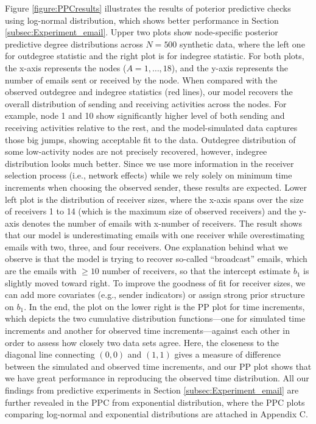 \documentclass[ba]{imsart}
\numberwithin{equation}{section}
\theoremstyle{plain}
\begin{document}
	Figure \ref{figure:PPCresults} illustrates the results of poterior predictive checks using log-normal distribution, which shows better performance in Section \ref{subsec:Experiment_email}. Upper two plots show node-specific posterior predictive degree distributions across $N=500$ synthetic data, where the left one for outdegree statistic and the right plot is for indegree statistic. For both plots, the x-axis represents the nodes ($A=1,\ldots,18$), and the y-axis represents the number of emails sent or received by the node. When compared with the observed outdegree and indegree statistics (red lines), our model recovers the overall distribution of sending and receiving activities across the nodes. For example, node 1 and 10 show significantly higher level of both sending and receiving activities relative to the rest, and the model-simulated data captures those big jumps, showing acceptable fit to the data. Outdegree distribution of some low-activity nodes are not precisely recovered, however, indegree distribution looks much better. Since we use more information in the receiver selection process (i.e., network effects) while we rely solely on minimum time increments when choosing the observed sender, these results are expected. Lower left plot is the distribution of receiver sizes, where the x-axis spans over the size of receivers 1 to 14 (which is the maximum size of observed receivers) and the y-axis denotes the number of emails with x-number of receivers. The result shows that our model is underestimating emails with one receiver while overestimating emails with two, three, and four receivers. One explanation behind what we observe is that the model is trying to recover so-called ``broadcast'' emails, which are the emails with $\geq 10$ number of receivers, so that the intercept estimate $b_1$ is slightly moved toward right. To improve the goodness of fit for receiver sizes, we can add more covariates (e.g., sender indicators) or assign strong prior structure on $b_1$. In the end, the plot on the lower right is the PP plot for time increments, which depicts the two cumulative distribution functions---one for simulated time increments and another for observed time increments---against each other in order to assess how closely two data sets agree. Here, the closeness to the diagonal line connecting $(0, 0)$ and $(1, 1)$ gives a measure of difference between the simulated and observed time increments, and our PP plot shows that we have great performance in reproducing the observed time distribution. All our findings from predictive experiments in Section \ref{subsec:Experiment_email} are further revealed in the PPC from exponential distribution, where the PPC plots comparing log-normal and exponential distributions are attached in Appendix C.
	
\end{document}
